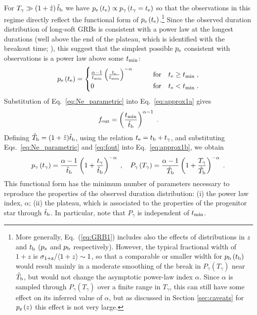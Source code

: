 \documentclass[useAMS,usenatbib]{mn2e}
\begin{document}
For $T_\gamma\gg \left(1+\hat{z}\right)\hat{t}_{\rm b}$ we have $p_{\rm e}\left(t_{\rm e}\right)\propto p_\gamma\left(t_\gamma=t_{\rm e}\right)$ so that the observations in this regime directly reflect the
functional form of $p_{\rm e}\left(t_{\rm e}\right)$.\footnote{More generally, Eq.~(\ref{eq:GRB1}) includes also the effects of  distributions in $z$ and $t_{\rm b}$ ($p_{\rm z}$ and $p_{\rm b}$ respectively). However, the typical fractional width of $1+z$ is $\sigma_{\rm 1+z}/\langle 1+z\rangle\sim 1$, so that a comparable or smaller width for $ p_{\rm b}\left(t_{\rm b}\right)$ would result mainly in a moderate smoothing of the break in $P_\gamma\left(T_\gamma\right)$ near $\hat{T}_{\rm b}$, but would not change the asymptotic power-law index $\alpha$. Since $\alpha$ is sampled through $P_\gamma\left(T_\gamma\right)$ over a finite range in $T_\gamma$, this can still have some effect on its inferred value of $\alpha$, but as discussed in Section \ref{sec:caveats} for $p_{\rm z}\left(z\right)$ this effect is not very large.}
Since the observed duration distribution of long-soft GRBs is consistent with a power law at the longest durations (well above the end of the plateau, which is identified with the breakout time; \citealt{Bromberg2012}), this suggest that the simplest possible $p_{\rm e}$ consistent with observations is a power law above some $t_{\rm min}$:
\begin{equation}\label{eq:Ne_parametric}
p_{\rm e}\left(t_{\rm e}\right) =
\begin{cases}
\frac{\alpha-1}{t_{\rm min}}
\left(\frac{t_{\rm e}}{t_{\rm min}}\right)^{-\alpha}& \qquad\text{for}\quad t_{\rm e} \geq t_{\rm min} \;, \\
0 &\qquad\text{for}\quad t_{\rm e}<t_{\rm min}\;.
\end{cases}
\end{equation}
Substitution of Eq.~\eqref{eq:Ne_parametric} into
Eq.~\eqref{eq:approx1a} gives
\begin{equation}
\label{eq:fout}
f_{\rm out} = \left(\frac{t_{\rm min}}{\hat{t}_{\rm b}}\right)^{\alpha-1}\;.
\end{equation}
Defining $\hat{T}_{\rm b} = (1+\hat{z})\hat{t}_{\rm b}$, using the relation $t_{\rm e}=t_{\rm b}+t_\gamma$,
and substituting Eqs.~\eqref{eq:Ne_parametric} and \eqref{eq:fout} into Eq.~\eqref{eq:approx1b}, we obtain
\begin{equation}
\label{eq:Pe1}
p_\gamma\left(t_\gamma\right)=\frac{\alpha-1}{\hat{t}_{\rm b}}
\left(1+\frac{t_\gamma}{\hat{t}_{\rm b}}\right)^{-\alpha}\;,\quad
P_\gamma\left(T_\gamma\right)=\frac{\alpha-1}{\hat{T}_{\rm b}}
\left(1+\frac{T_\gamma}{\hat{T}_{\rm b}}\right)^{-\alpha}\;.
\end{equation}
This functional form has the minimum number of parameters necessary to reproduce the properties of the observed duration distribution: (i) the power law index, $\alpha$; (ii) the plateau, which is associated to the properties of the progenitor star through $\hat{t}_{\rm b}$. In particular, note that $P_\gamma$ is independent of $t_{\rm min}$.
\end{document}
